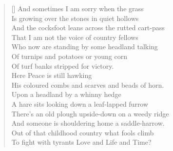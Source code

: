 \clearpage
\thispagestyle{empty}

\vspace*{\fill}

\begin{center}
\begin{minipage}{0.95\textwidth}
\large

\settowidth{\versewidth}{And the cocksfoot leans across the rutted cart-pass}
\begin{verse}[\versewidth]
And sometimes I am sorry when the grass \\
Is growing over the stones in quiet hollows \\
And the cocksfoot leans across the rutted cart-pass \\
That I am not the voice of country fellows \\
Who now are standing by some headland talking \\
Of turnips and potatoes or young corn \\
Of turf banks stripped for victory. \\
Here Peace is still hawking \\
His coloured combs and scarves and beads of horn. \\[0.5em]
Upon a headland by a whinny hedge \\
A hare sits looking down a leaf-lapped furrow \\
There's an old plough upside-down on a weedy ridge \\
And someone is shouldering home a saddle-harrow. \\[0.5em]
Out of that childhood country what fools climb \\
To fight with tyrants Love and Life and Time?
\end{verse}


\end{minipage}
\end{center}

\vspace*{\fill}
\clearpage


